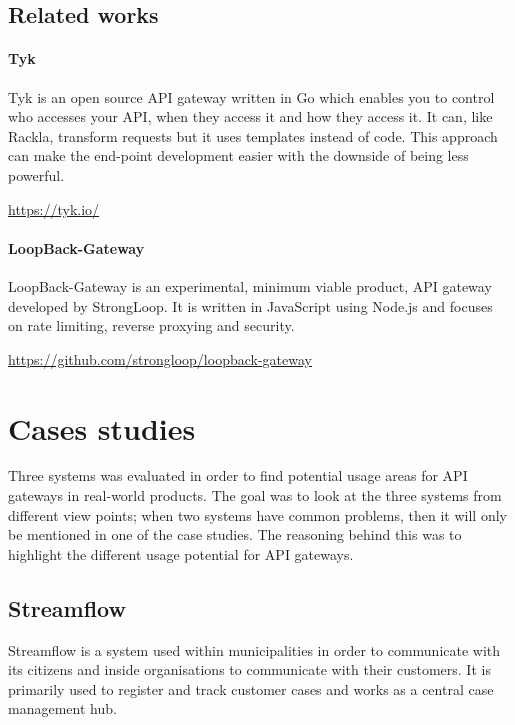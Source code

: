 \documentclass{cslthse-msc}
\begin{document}
\section{Related works}
\subsubsection{Tyk}

Tyk is an open source API gateway written in Go which enables you to control who accesses your API, when they access it and how they access it. It can, like Rackla, transform requests but it uses templates instead of code. This approach can make the end-point development easier with the downside of being less powerful.

\vspace{5mm}

\noindent \url{https://tyk.io/}

\subsubsection{LoopBack-Gateway}

LoopBack-Gateway is an experimental, minimum viable product, API gateway developed by StrongLoop. It is written in JavaScript using Node.js and focuses on rate limiting, reverse proxying and security.

\vspace{5mm}

\noindent \url{https://github.com/strongloop/loopback-gateway}

\chapter{Cases studies}

Three systems was evaluated in order to find potential usage areas for API gateways in real-world products. The goal was to look at the three systems from different view points; when two systems have common problems, then it will only be mentioned in one of the case studies. The reasoning behind this was to highlight the different usage potential for API gateways.

\section{Streamflow}
Streamflow\cite{streamflow} is a system used within municipalities in order to communicate with its citizens and inside organisations to communicate with their customers. It is primarily used to register and track customer cases and works as a central case management hub.
\end{document}
